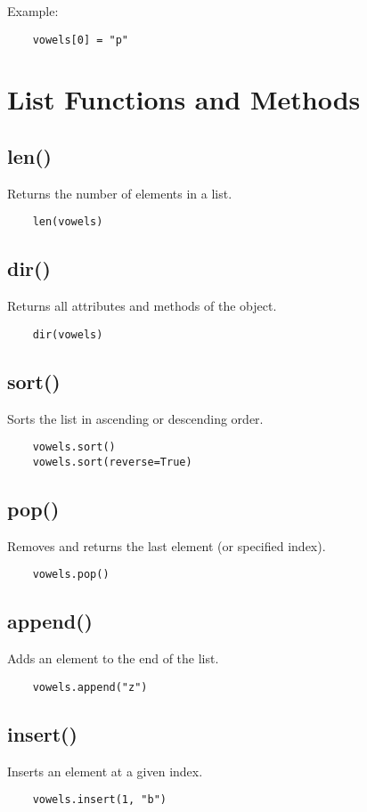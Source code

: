 \noindent Example:
\begin{verbatim}
	vowels[0] = "p"
\end{verbatim}

\section{List Functions and Methods}

\subsection{len()}
Returns the number of elements in a list.
\begin{verbatim}
	len(vowels)
\end{verbatim}

\subsection{dir()}
Returns all attributes and methods of the object.
\begin{verbatim}
	dir(vowels)
\end{verbatim}

\subsection{sort()}
Sorts the list in ascending or descending order.
\begin{verbatim}
	vowels.sort()
	vowels.sort(reverse=True)
\end{verbatim}

\subsection{pop()}
Removes and returns the last element (or specified index).
\begin{verbatim}
	vowels.pop()
\end{verbatim}

\subsection{append()}
Adds an element to the end of the list.
\begin{verbatim}
	vowels.append("z")
\end{verbatim}

\subsection{insert()}
Inserts an element at a given index.
\begin{verbatim}
	vowels.insert(1, "b")
\end{verbatim}

